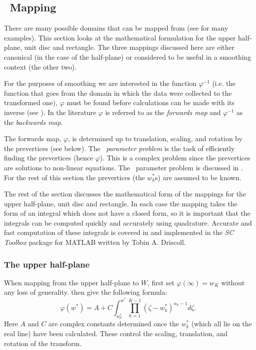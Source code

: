 
\subsection{\sch\ Mapping}
\label{schparprob}
There are many possible domains that can be mapped from (see \cite[section 4]{driscoll} for \label{cor-3s12}many examples). This section looks at the mathematical formulation for the upper half-plane, unit disc and rectangle. The three mappings discussed here are either canonical (in the case of the half-plane) or considered to be useful in a smoothing context (the other two).

For the purposes of smoothing we are interested in the function $\varphi^{-1}$ (i.e. the function that goes from the domain in which the data were collected to the transformed one), $\varphi$ must be found before calculations can be made with its inverse (see ). In the literature $\varphi$ is referred to as the \emph{forwards map} and $\varphi^{-1}$ as the \emph{backwards map}.

The forwards map, $\varphi$, is determined up to translation, scaling, and rotation by the prevertices (see below). \label{cor-3s13-1}The \emph{\sch\ parameter problem} is the task of efficiently finding the prevertices (hence $\varphi$). This is a complex problem since the prevertices are solutions to non-linear equations. The \sch\ parameter problem is discussed in . For the rest of this section the prevertices (the $w^*_k$s) are assumed to be known. 

The rest of the section discusses the mathematical form of the mappings for the upper half-plane, unit disc and rectangle. In each case the mapping takes the form of an integral which does not have a closed form, so it is important that the integrals can be computed quickly and accurately using quadrature. Accurate and fast computation of these integrals is covered in  and implemented in the \textit{SC Toolbox} package for MATLAB written by Tobin A. Driscoll.

\subsubsection{The upper half-plane}
\label{sc-parprob}

When mapping from the upper half-plane\label{cor-3s14-1} to $W$\label{cor-3s1-1}, first set $\varphi(\infty) = w_K$ without any loss of generality.  then give the following formula:
\begin{equation}
\varphi(w^*) = A + C \int^{w^*}_{w^*_0} \prod_{k=1}^{K-1} \left (\zeta-w^*_k \right )^{\alpha_k-1} d\zeta.
\end{equation}
Here $A$ and $C$ are complex constants determined once the $w^*_k$ (which all lie on the real line\label{cor-3s13-2}) have been calculated. These control the scaling, translation, and rotation of the transform. 

